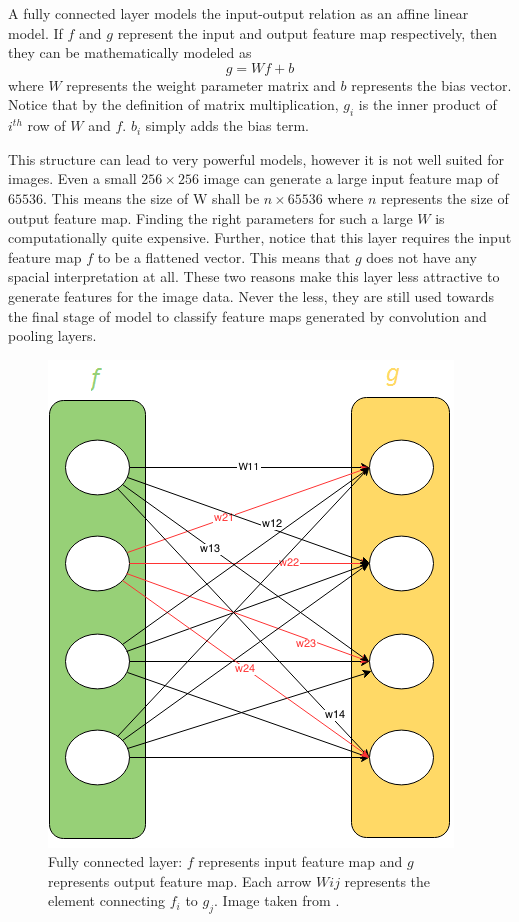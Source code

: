 A fully connected layer models the input-output relation as an affine linear model. If $f$ and $g$ represent the input and output feature map respectively, then they can be mathematically modeled as 
$$g = Wf+b$$
where $W$ represents the weight parameter matrix and $b$ represents the bias vector. Notice that by the definition of matrix multiplication, $g_i$ is the inner product of $i^{th}$ row of $W$ and $f$. $b_i$ simply adds the bias term. 

This structure can lead to very powerful models, however it is not well suited for images. Even a small $256\times 256$ image can generate a large input feature map of $65536$. This means the size of W shall be $n \times 65536$ where $n$ represents the size of output feature map. Finding the right parameters for such a large $W$ is computationally quite expensive. Further, notice that this layer requires the input feature map $f$ to be a flattened vector. This means that $g$ does not have any spacial interpretation at all. These two reasons make this layer less attractive to generate features for the image data. Never the less, they are still used towards the final stage of model to classify feature maps generated by convolution and pooling layers. 

\begin{figure}
    \centering
    \includegraphics[width=0.5\linewidth]{images/fully_connected.png}
    \caption[Fully connected layer]{Fully connected layer: $f$ represents input feature map and $g$ represents output feature map. Each arrow $Wij$ represents the element connecting $f_i$ to $g_j$. Image taken from \cite{ref_fully_connected}.}
    \label{fig:fully_connected}
\end{figure}

